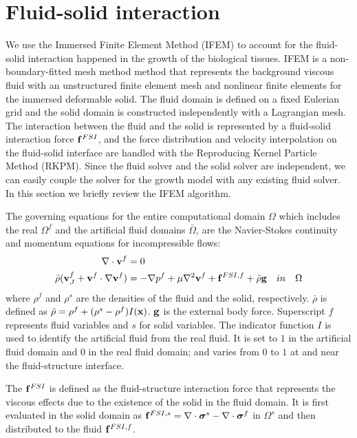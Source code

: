 \section{Fluid-solid interaction}
We use the Immersed Finite Element Method (IFEM) to account for the fluid-solid interaction happened in the growth of the biological tissues. IFEM is a non-boundary-fitted mesh method method that represents the background viscous fluid with an unstructured finite element mesh and nonlinear finite elements for the immersed deformable solid. The fluid domain is defined on a fixed Eulerian grid and the solid domain is constructed independently with a Lagrangian mesh. The interaction between the fluid and the solid is represented by a fluid-solid interaction force $\bold{f}^{FSI}$, and the force distribution and velocity interpolation on the fluid-solid interface are handled with the Reproducing Kernel Particle Method (RKPM). Since the fluid solver and the solid solver are independent, we can easily couple the solver for the growth model with any existing fluid solver. In this section we briefly review the IFEM algorithm.

The governing equations for the entire computational domain $\Omega$ which includes the real $\Omega^f$ and the artificial fluid domains $\bar\Omega$, are the Navier-Stokes continuity and momentum equations for incompressible flows:
\begin{subequations} \label{NS}
\begin{align}
\nabla \cdot \bold{v}^f &= 0 \\
\bar\rho (\bold{v}_{, t}^f + \bold{v}^f \cdot \nabla\bold{v}^f) &= -\nabla p^f + \mu\nabla^2 \bold{v}^f + \bold{f}^{FSI,f} + \bar\rho\bold{g} \quad in \quad \Omega 
\end{align}
\end{subequations}
where $\rho^f$ and $\rho^s$ are the densities of the fluid and the solid, respectively. $\bar\rho$ is defined as $\bar\rho = \rho^f + (\rho^s - \rho^f)I(\bold{x})$. $\bold{g}$ is the external body force. Superscript $f$ represents fluid variables and $s$ for solid variables. The indicator function $I$ is used to identify the artificial fluid from the real fluid. It is set to $1$ in the artificial fluid domain and $0$ in the real fluid domain; and varies from $0$ to $1$ at and near the fluid-structure interface.

The $\bold{f}^{FSI}$ is defined as the fluid-structure interaction force that represents the viscous effects due to the existence of the solid in the fluid domain. It is first evaluated in the solid domain as $\bold{f}^{FSI,s} = \nabla \cdot \boldsymbol{\sigma}^s - \nabla \cdot \boldsymbol{\sigma}^f$ in $\Omega^s$ and then distributed to the fluid $\bold{f}^{FSI,f}$.

